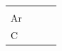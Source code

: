 \begin{enumerate}[noitemsep, label=\textbf{\arabic*}. ]
{\begin{tabular}[t]{|l|l|l|l|}
    
         &
    
    
         &
    
    
     \tabularnewline\cline{1-1}\cline{2-2}\cline{3-3}\cline{4-4}
    
    
        \begin{math}\mathrm{Ar}\end{math} &
    
    
         &
    
    
         &
    
    
     \tabularnewline\cline{1-1}\cline{2-2}\cline{3-3}\cline{4-4}
    
    
        \begin{math}\mathrm{C}\end{math} &
    

\end{tabular}}
\end{enumerate}
